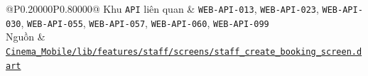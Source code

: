 \begin{longtable}{@{}P{0.20000\SRSWidth}P{0.80000\SRSWidth}@{}}
Khu \texttt{API} liên quan & \texttt{WEB-\allowbreak{}API-\allowbreak{}013}, \texttt{WEB-\allowbreak{}API-\allowbreak{}023}, \texttt{WEB-\allowbreak{}API-\allowbreak{}030}, \texttt{WEB-\allowbreak{}API-\allowbreak{}055}, \texttt{WEB-\allowbreak{}API-\allowbreak{}057}, \texttt{WEB-\allowbreak{}API-\allowbreak{}060}, \texttt{WEB-\allowbreak{}API-\allowbreak{}099} \\[3pt]
Nguồn & \href{../../../Cinema\_Mobile/lib/features/staff/screens/staff\_create\_booking\_screen.dart}{\texttt{Cinema\_\allowbreak{}Mobile/\allowbreak{}lib/\allowbreak{}features\allowbreak{}/\allowbreak{}staff/\allowbreak{}screens/\allowbreak{}staff\_\allowbreak{}create\_\allowbreak{}booking\_\allowbreak{}screen.\allowbreak{}dart}} \\[3pt]
\end{longtable}
\endgroup

